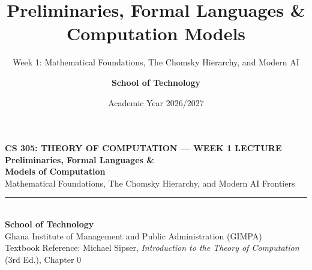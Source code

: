 \documentclass[aspectratio=169, 10pt]{beamer}
\title{\textbf{\LARGE Preliminaries, Formal Languages \& Computation Models}}
\subtitle{\vspace{0.12cm}\large Week 1: Mathematical Foundations, The Chomsky Hierarchy, and Modern AI}
\author{\textbf{School of Technology}}
\institute{Ghana Institute of Management and Public Administration (GIMPA)}
\date{Academic Year 2026/2027}
\begin{document}
\begin{frame}[plain]
  \vspace{0.4cm}
  \begin{center}
    {\scriptsize\bfseries\color{gimpaaccent}CS 305: THEORY OF COMPUTATION --- WEEK 1 LECTURE}\\[0.22cm]
    {\LARGE\bfseries\color{gimpanavy}Preliminaries, Formal Languages \&\\[0.08cm] Models of Computation}\\[0.22cm]
    {\normalsize\color{gimpaslate}Mathematical Foundations, The Chomsky Hierarchy, and Modern AI Frontiers}\\[0.30cm]
    
    {\color{ruleGray}\rule{0.6\paperwidth}{0.6pt}}\\[0.30cm]
    
    {\small\bfseries\color{gimpanavy}School of Technology}\\[0.06cm]
    {\footnotesize\color{gimpaslate}Ghana Institute of Management and Public Administration (GIMPA)}\\[0.20cm]
    {\scriptsize\color{gimpaslate}Textbook Reference: Michael Sipser, \textit{Introduction to the Theory of Computation} (3rd Ed.), Chapter 0}
  \end{center}
\end{frame}
\end{document}
